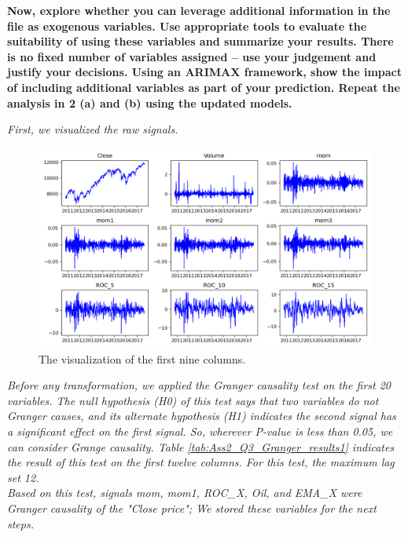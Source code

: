\item \textbf{Now, explore whether you can leverage additional information in the file as exogenous variables. Use appropriate tools to evaluate the suitability of using these variables and summarize your results. There is no fixed number of variables assigned – use your judgement and justify your decisions.  Using an ARIMAX framework, show the impact of including additional variables as part of your prediction. Repeat the analysis in 2 (a) and (b) using the updated models.} 


\textit{First, we visualized the raw signals.} 

\begin{figure}[H]
    \centering
    \begin{minipage}[b]{1\textwidth}
        \includegraphics[width=\textwidth]{figures/Ass2/Ass2_Q3_raw_signal.png}
    \end{minipage}
    \caption{The visualization of the first nine columns.}
    \label{fig:Ass2_Q3_raw_signal}
\end{figure}


\textit{Before any transformation, we applied the Granger causality test on the first 20 variables. The null hypothesis (H0) of this test says that two variables do not Granger causes, and its alternate hypothesis (H1) indicates the second signal has a significant effect on the first signal. So, wherever P-value is less than 0.05, we can consider Grange causality. Table \ref{tab:Ass2_Q3_Granger_results1} indicates the result of this test on the first twelve columns. For this test, the maximum lag set 12.\\
Based on this test, signals mom, mom1, ROC\_X, Oil, and EMA\_X were Granger causality of the "Close price"; We stored these variables for the next steps. }

